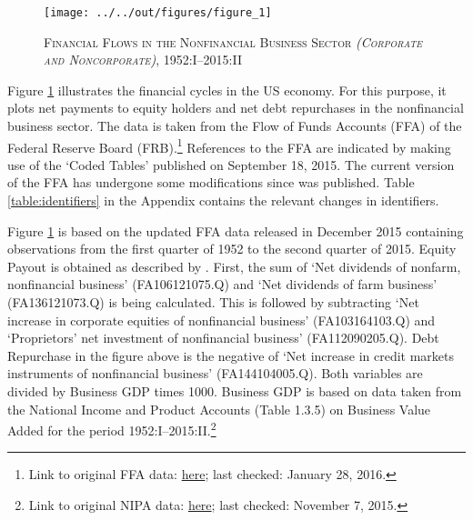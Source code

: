 \begin{figure}
    
    \centering

    \texttt{[image: ../../out/figures/figure\_1]}

    \caption{\textsc{Financial Flows in the Nonfinancial Business Sector \textit{(Corporate and Noncorporate)}}, 1952:I--2015:II}
    
    \label{fig:figure_1}

\end{figure}


Figure \ref{fig:figure_1} illustrates the financial cycles in the US economy. For this purpose, it plots net payments to equity holders and net debt repurchases in the nonfinancial business sector. The data is taken from the Flow of Funds Accounts (FFA) of the Federal Reserve Board (FRB).\footnote{Link to original FFA data: \href{http://www.federalreserve.gov/datadownload/Download.aspx?rel=Z1&series=1f08e962a27dff21b89a7212d58b8346&filetype=spreadsheetml&label=include&layout=seriescolumn&from=03/01/1952&to=06/30/2015}{here}; last checked: January 28, 2016.}
References to the FFA are indicated by making use of the ‘Coded Tables’ published on September 18, 2015. The current version of the FFA has undergone some modifications since \citet{JERMANNfinancial} was published. 
Table \ref{table:identifiers} in the Appendix contains the relevant changes in identifiers.

Figure \ref{fig:figure_1} is based on the updated FFA data released in December 2015 containing observations from the first quarter of 1952 to the second quarter of 2015. Equity Payout is obtained as described by \citeauthor{JERMANNfinancial}. First, the sum of ‘Net dividends of nonfarm, nonfinancial business’ (FA106121075.Q) and ‘Net dividends of farm business’ (FA136121073.Q) is being calculated. This is followed by subtracting ‘Net increase in corporate equities of nonfinancial business’ (FA103164103.Q) and ‘Proprietors’ net investment of nonfinancial business’ (FA112090205.Q). Debt Repurchase in the figure above is the negative of ‘Net increase in credit markets instruments of nonfinancial business’ (FA144104005.Q). 
Both variables are divided by Business GDP times 1000. Business GDP is based on data taken from the National Income and Product Accounts (Table 1.3.5) on Business Value Added for the period 1952:I--2015:II.\footnote{Link to original NIPA data: \href{http://www.bea.gov//national/nipaweb/DownSS2.asp}{here}; last checked: November 7, 2015.} 

